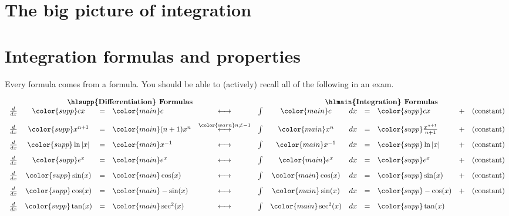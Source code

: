 \documentclass[../main.tex]{subfiles}
\begin{document}
 \section{The big picture of integration}

\clearpage

\section{Integration formulas and properties} \label{sec:integration-formulas}
Every  formula comes from a  formula. \faStar{} You should be able to (actively) recall all of the following in an exam.

\[
  \begin{array}{rcclcrclllcl}
    \multicolumn{5}{c}{\text{\textbf{\hlsupp{Differentiation} Formulas}}} & \multicolumn{7}{c}{\text{\textbf{\hlmain{Integration} Formulas}}} \\
    \frac{d}{dx} & {\color{supp} cx} &=& {\color{main} c}
    & \longleftrightarrow
    & \int & {\color{main} c} & dx &=& {\color{supp} cx}
    &+& (\text{constant}) \\[2ex]
    \frac{d}{dx} & {\color{supp} x^{n+1}  } &=& {\color{main} (n+1) x^{n}}
    & \overset{\color{warn} n \ne -1}{\longleftrightarrow}
    & \int & {\color{main} x^{n}} & dx &=& {\color{supp} \frac{x^{n+1}}{n+1} }
    &+& (\text{constant}) \\[2ex]
    \frac{d}{dx} & {\color{supp} \ln|x| } &=& {\color{main} x^{-1}}
    & \longleftrightarrow
    & \int & {\color{main} x^{-1}} & dx &=& {\color{supp} \ln|x|}
    &+& (\text{constant}) \\[2ex]
    \frac{d}{dx} & {\color{supp} e^{x}} &=& {\color{main} e^{x}}
    & \longleftrightarrow
    & \int & {\color{main} e^{x}      } & dx &=& {\color{supp} e^{x}}
    &+& (\text{constant}) \\[2ex]
    \frac{d}{dx} & {\color{supp} \sin(x)} &=& {\color{main} \cos(x)}
    & \longleftrightarrow
    & \int & {\color{main} \cos(x)} & dx &=& {\color{supp} \sin(x)}
    &+& (\text{constant}) \\[2ex]
    \frac{d}{dx} & {\color{supp} \cos(x)} &=& {\color{main} -\sin(x)}
    & \longleftrightarrow
    & \int & {\color{main} \sin(x)} & dx &=& {\color{supp} -\cos(x)}
    &+& (\text{constant}) \\[2ex]
    \frac{d}{dx} & {\color{supp} \tan(x)} &=& {\color{main} \sec^{2}(x)}
    & \longleftrightarrow
    & \int & {\color{main} \sec^{2}(x)} & dx &=& {\color{supp} \tan(x)}

\end{array}\]
\end{document}
